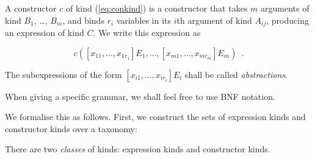 A constructor $c$ of kind (\ref{eq:conkind}) is a constructor that takes $m$ arguments of kind $B_1$, \ldots, $B_m$, and binds $r_i$ variables in its $i$th argument of kind $A_{ij}$,
producing an expression of kind $C$.  We write this expression as

\begin{equation}
\label{eq:expression}
c([x_{11}, \ldots, x_{1r_1}]E_1, \ldots, [x_{m1}, \ldots, x_{mr_m}]E_m) \enspace .
\end{equation}

The subexpressions of the form $[x_{i1}, \ldots, x_{ir_i}]E_i$ shall be called \emph{abstractions}.

When giving a specific grammar, we shall feel free to use BNF notation.  

We formalise this as follows.  First, we construct the sets of expression kinds and constructor kinds over a taxonomy:

\begin{frame}[fragile]
There are two \emph{classes} of kinds: expression kinds and constructor kinds.

\begin{code}%
\>[0]\<[2]%
\>[2]  \AgdaSymbol{:}  \<%
\\
\>[2]\<[4]%
\>[4] \AgdaSymbol{:} \<%
\\
\>[2]\<[4]%
\>[4] \AgdaSymbol{:}   \<%
\\
%
\\
\>[0]\<[2]%
\>[2]  \AgdaSymbol{:}    \<%
\\
\>[2]\<[4]%
\>[4] \AgdaSymbol{:}    \<%
\\
%
\\
\>[2]\<[4]%
\>[4] \<[9]%
\>[9]\AgdaSymbol{:}     \AgdaSymbol{(} \AgdaSymbol{)}\<%
\\
\>[2]\<[4]%
\>[4] \<[9]%
\>[9]\AgdaSymbol{:}  \AgdaSymbol{\{}\AgdaSymbol{\}}       \<[51]%
\>[51]\<%
\\
\>[4]\<[11]%
\>[11] \AgdaSymbol{(} \AgdaSymbol{)}   \AgdaSymbol{(} \AgdaSymbol{)}\<%
\end{code}
\end{frame}
